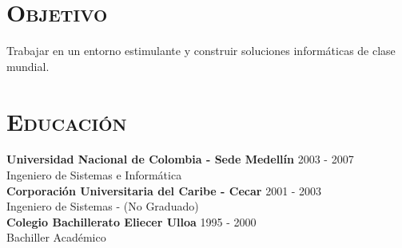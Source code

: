 \begin{resume}



\section{\textsc{Objetivo}}
Trabajar en un entorno estimulante y construir soluciones
inform\'{a}ticas de clase mundial.



\section{\textsc{Educaci\'{o}n}}
\textbf{Universidad Nacional de Colombia  - Sede  Medell\'{i}n} \hfill 2003 - 2007 \\
{Ingeniero de Sistemas e Inform\'{a}tica } \hfill\\

\textbf{Corporaci\'{o}n Universitaria del Caribe  - Cecar} \hfill  2001 - 2003  \\
{Ingeniero de Sistemas - (No Graduado) } \hfill \\

\textbf{Colegio Bachillerato Eliecer Ulloa} \hfill  1995 - 2000  \\
{Bachiller Acad\'{e}mico} \hfill
\newline



\end{resume}
